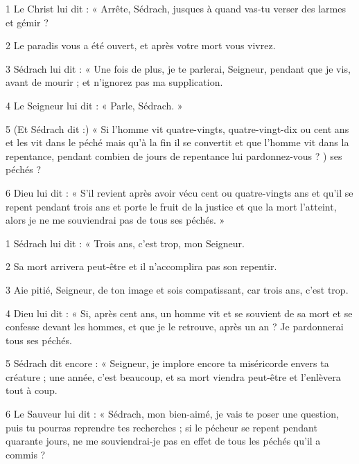 
\par 1 Le Christ lui dit : « Arrête, Sédrach, jusques à quand vas-tu verser des larmes et gémir ?   

\par 2 Le paradis vous a été ouvert, et après votre mort vous vivrez.

\par 3 Sédrach lui dit : « Une fois de plus, je te parlerai, Seigneur, pendant que je vis, avant de mourir ; et n’ignorez pas ma supplication.

\par 4 Le Seigneur lui dit : « Parle, Sédrach. »

\par 5 (Et Sédrach dit :) « Si l'homme vit quatre-vingts, quatre-vingt-dix ou cent ans et les vit dans le péché mais qu'à la fin il se convertit et que l'homme vit dans la repentance, pendant combien de jours de repentance lui pardonnez-vous ? ) ses péchés ?

\par 6 Dieu lui dit : « S'il revient après avoir vécu cent ou quatre-vingts ans et qu'il se repent pendant trois ans et porte le fruit de la justice et que la mort l'atteint, alors je ne me souviendrai pas de tous ses péchés. »


\par 1 Sédrach lui dit : « Trois ans, c'est trop, mon Seigneur.

\par 2 Sa mort arrivera peut-être et il n'accomplira pas son repentir.

\par 3 Aie pitié, Seigneur, de ton image et sois compatissant, car trois ans, c'est trop.

\par 4 Dieu lui dit : « Si, après cent ans, un homme vit et se souvient de sa mort et se confesse devant les hommes, et que je le retrouve, après un an ? Je pardonnerai tous ses péchés.

\par 5 Sédrach dit encore : « Seigneur, je implore encore ta miséricorde envers ta créature ; une année, c'est beaucoup, et sa mort viendra peut-être et l'enlèvera tout à coup.

\par 6 Le Sauveur lui dit : « Sédrach, mon bien-aimé, je vais te poser une question, puis tu pourras reprendre tes recherches ; si le pécheur se repent pendant quarante jours, ne me souviendrai-je pas en effet de tous les péchés qu'il a commis ?

